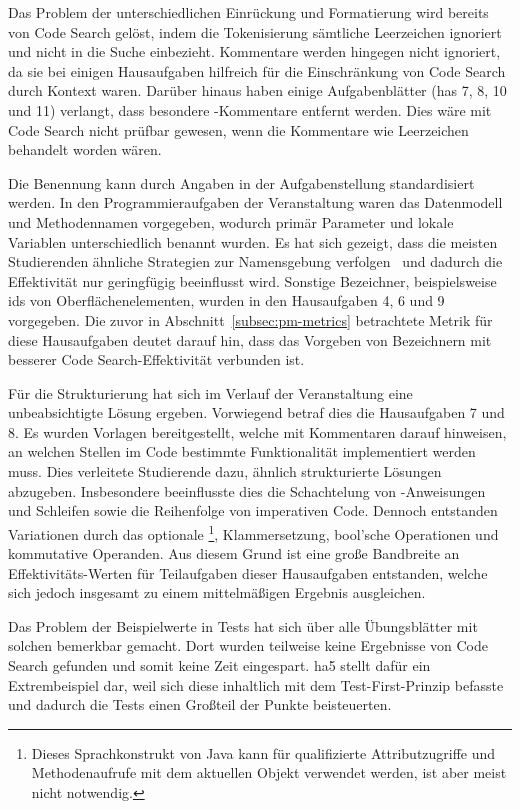 Das Problem der unterschiedlichen Einrückung und Formatierung wird bereits von Code Search gelöst, indem die Tokenisierung sämtliche Leerzeichen ignoriert und nicht in die Suche einbezieht.
Kommentare werden hingegen nicht ignoriert, da sie bei einigen Hausaufgaben hilfreich für die Einschränkung von Code Search durch Kontext waren.
Darüber hinaus haben einige Aufgabenblätter (\acp{ha} 7, 8, 10 und 11) verlangt, dass besondere -Kommentare entfernt werden.
Dies wäre mit Code Search nicht prüfbar gewesen, wenn die Kommentare wie Leerzeichen behandelt worden wären.

Die Benennung kann durch Angaben in der Aufgabenstellung standardisiert werden.
In den Programmieraufgaben der Veranstaltung waren das Datenmodell und Methodennamen vorgegeben, wodurch primär Parameter und lokale Variablen unterschiedlich benannt wurden.
Es hat sich gezeigt, dass die meisten Studierenden ähnliche Strategien zur Namensgebung verfolgen~ und dadurch die Effektivität nur geringfügig beeinflusst wird.
Sonstige Bezeichner, beispielsweise \acp{id} von Oberflächenelementen, wurden in den Hausaufgaben 4, 6 und 9 vorgegeben.
Die zuvor in Abschnitt~\ref{subsec:pm-metrics} betrachtete Metrik für diese Hausaufgaben deutet darauf hin, dass das Vorgeben von Bezeichnern mit besserer Code Search-Effektivität verbunden ist.

Für die Strukturierung hat sich im Verlauf der Veranstaltung eine unbeabsichtigte Lösung ergeben.
Vorwiegend betraf dies die Hausaufgaben 7 und 8.
Es wurden Vorlagen bereitgestellt, welche mit Kommentaren darauf hinweisen, an welchen Stellen im Code bestimmte Funktionalität implementiert werden muss.
Dies verleitete Studierende dazu, ähnlich strukturierte Lösungen abzugeben.
Insbesondere beeinflusste dies die Schachtelung von -Anweisungen und Schleifen sowie die Reihenfolge von imperativen Code.
Dennoch entstanden Variationen durch das optionale \footnote{
    Dieses Sprachkonstrukt von Java kann für qualifizierte Attributzugriffe und Methodenaufrufe mit dem aktuellen Objekt verwendet werden, ist aber meist nicht notwendig.
}, Klammersetzung, bool'sche Operationen und kommutative Operanden.
Aus diesem Grund ist eine große Bandbreite an Effektivitäts-Werten für Teilaufgaben dieser Hausaufgaben entstanden, welche sich jedoch insgesamt zu einem mittelmäßigen Ergebnis ausgleichen.

Das Problem der Beispielwerte in Tests hat sich über alle Übungsblätter mit solchen bemerkbar gemacht.
Dort wurden teilweise keine Ergebnisse von Code Search gefunden und somit keine Zeit eingespart.
\ac{ha}5 stellt dafür ein Extrembeispiel dar, weil sich diese inhaltlich mit dem Test-First-Prinzip befasste und dadurch die Tests einen Großteil der Punkte beisteuerten.

